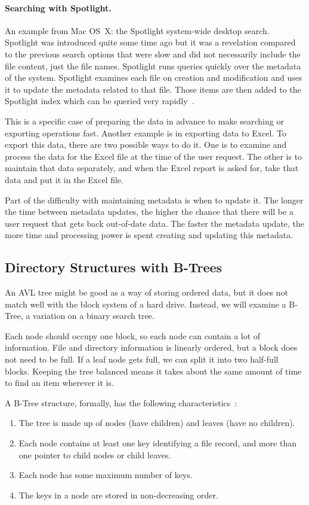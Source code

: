 \paragraph{Searching with Spotlight.}
An example from Mac OS~X: the Spotlight system-wide desktop search. Spotlight was introduced quite some time ago but it was a revelation compared to the previous search options that were slow and did not necessarily include the file content, just the file names. Spotlight runs queries quickly over the metadata of the system. Spotlight examines each file on creation and modification and uses it to update the metadata related to that file. Those items are then added to the Spotlight index which can be queried very rapidly~\cite{spotlight}.

This is a specific case of preparing the data in advance to make searching or exporting operations fast. Another example is in exporting data to Excel. To export this data, there are two possible ways to do it. One is to examine and process the data for the Excel file at the time of the user request. The other is to maintain that data separately, and when the Excel report is asked for, take that data and put it in the Excel file.

Part of the difficulty with maintaining metadata is when to update it. The longer the time between metadata updates, the higher the chance that there will be a user request that gets back out-of-date data. The faster the metadata update, the more time and processing power is spent creating and updating this metadata.

\subsection*{Directory Structures with B-Trees}
An AVL tree might be good as a way of storing ordered data, but it does not match well with the block system of a hard drive. Instead, we will examine a B-Tree, a variation on a binary search tree. 

Each node should occupy one block, so each node can contain a lot of information. File and directory information is linearly ordered, but a block does not need to be full. If a leaf node gets full, we can split it into two half-full blocks. Keeping the tree balanced means it takes about the same amount of time to find an item wherever it is.

A B-Tree structure, formally, has the following characteristics~\cite{osi}:

\begin{enumerate}
	\item The tree is made up of nodes (have children) and leaves (have no children).
	\item Each node contains at least one key identifying a file record, and more than one pointer to child nodes or child leaves.
	\item Each node has some maximum number of keys.
	\item The keys in a node are stored in non-decreasing order.
\end{enumerate}

